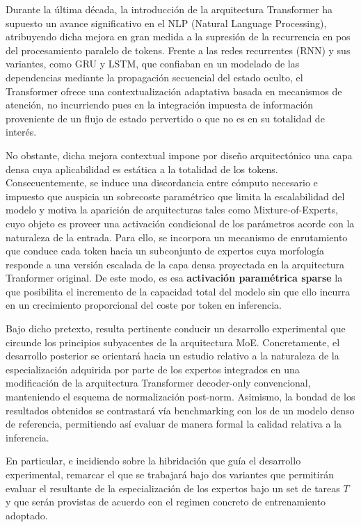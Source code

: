 \documentclass[10pt,twocolumn,a4paper]{article}
\begin{document}
Durante la última década, la introducción de la arquitectura Transformer \citep{vaswani2017att} ha supuesto un avance significativo en el NLP (Natural Language Processing),  atribuyendo dicha mejora en gran medida a la supresión de la recurrencia en pos del procesamiento paralelo de tokens. Frente a las redes recurrentes (RNN) y sus variantes, como GRU y LSTM, que confiaban en un modelado de  las dependencias mediante la propagación secuencial del estado oculto, el Transformer ofrece una contextualización adaptativa basada en mecanismos de atención,  no incurriendo pues en la integración impuesta de información proveniente de un flujo de estado pervertido o que no es en su totalidad de interés.


No obstante, dicha mejora contextual impone por diseño arquitectónico una capa densa cuya aplicabilidad es estática a la totalidad de los tokens. Consecuentemente, se induce una discordancia entre cómputo necesario e  impuesto que auspicia un sobrecoste paramétrico que limita la escalabilidad del modelo y motiva la aparición de arquitecturas tales como Mixture-of-Experts\citep{shazeer2017moe}, cuyo objeto es proveer una activación condicional de los parámetros acorde con la naturaleza de la entrada. Para ello, se incorpora un mecanismo de enrutamiento que conduce  cada token hacia un subconjunto de expertos cuya morfología responde a una versión escalada de la capa densa proyectada en la arquitectura Tranformer original. De este modo, es esa  \textbf{activación paramétrica sparse} la que posibilita el incremento de la capacidad total del modelo sin que ello incurra en un crecimiento proporcional del coste por token en inferencia.



Bajo dicho pretexto, resulta pertinente  conducir un desarrollo experimental que circunde los principios subyacentes de la arquitectura  MoE. Concretamente, el desarrollo posterior se orientará hacia  un estudio relativo a la naturaleza de la especialización adquirida por parte de los expertos integrados en una modificación de la arquitectura Transformer decoder-only convencional,  manteniendo el esquema de normalización post-norm. Asimismo, la bondad de los resultados obtenidos se contrastará vía benchmarking con los de un modelo denso de referencia, permitiendo así evaluar de manera formal la calidad relativa a la inferencia.

En particular, e incidiendo sobre la hibridación que guía el desarrollo experimental, remarcar el que se trabajará bajo dos variantes que permitirán evaluar el resultante de la especialización de los expertos bajo un set de tareas $T$ y que serán provistas de acuerdo con el regimen concreto de entrenamiento adoptado.
\end{document}
